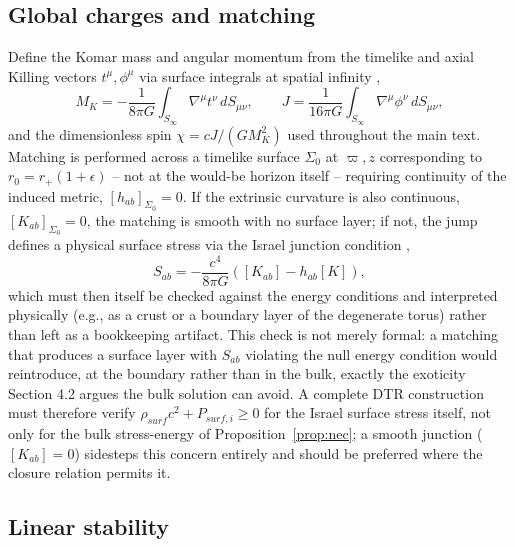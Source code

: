 \documentclass[11pt]{article}
\begin{document}
\subsection{Global charges and matching}

Define the Komar mass and angular momentum from the timelike and axial Killing vectors $t^\mu,\phi^\mu$ via surface integrals at spatial infinity \cite{komar1959},
\begin{equation}
M_K = -\frac{1}{8\pi G}\int_{S_\infty}\nabla^\mu t^\nu\, dS_{\mu\nu}, \qquad J = \frac{1}{16\pi G}\int_{S_\infty}\nabla^\mu \phi^\nu\, dS_{\mu\nu},
\end{equation}
and the dimensionless spin $\chi = cJ/(GM_K^2)$ used throughout the main text. Matching is performed across a timelike surface $\Sigma_0$ at $\varpi,z$ corresponding to $r_0=r_+(1+\epsilon)$ -- not at the would-be horizon itself -- requiring continuity of the induced metric, $[h_{ab}]_{\Sigma_0}=0$. If the extrinsic curvature is also continuous, $[K_{ab}]_{\Sigma_0}=0$, the matching is smooth with no surface layer; if not, the jump defines a physical surface stress via the Israel junction condition \cite{israel1966,poisson2004},
\begin{equation}
S_{ab} = -\frac{c^4}{8\pi G}\left([K_{ab}] - h_{ab}[K]\right),
\end{equation}
which must then itself be checked against the energy conditions and interpreted physically (e.g., as a crust or a boundary layer of the degenerate torus) rather than left as a bookkeeping artifact. This check is not merely formal: a matching that produces a surface layer with $S_{ab}$ violating the null energy condition would reintroduce, at the boundary rather than in the bulk, exactly the exoticity Section 4.2 argues the bulk solution can avoid. A complete DTR construction must therefore verify $\rho_{surf}c^2 + P_{surf,i}\geq 0$ for the Israel surface stress itself, not only for the bulk stress-energy of Proposition~\ref{prop:nec}; a smooth junction ($[K_{ab}]=0$) sidesteps this concern entirely and should be preferred where the closure relation permits it.

\subsection{Linear stability}
\end{document}
